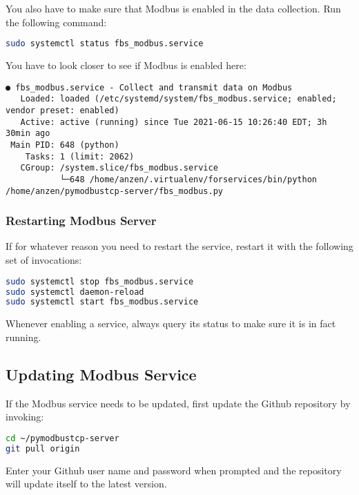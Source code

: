 \documentclass[10pt,]{article}
\begin{document}
You also have to make sure that Modbus is enabled in the data
collection. Run the following command:

\begin{lstlisting}[language=bash]
sudo systemctl status fbs_modbus.service
\end{lstlisting}

You have to look closer to see if Modbus is enabled here:

\begin{lstlisting}
● fbs_modbus.service - Collect and transmit data on Modbus
   Loaded: loaded (/etc/systemd/system/fbs_modbus.service; enabled; vendor preset: enabled)
   Active: active (running) since Tue 2021-06-15 10:26:40 EDT; 3h 30min ago
 Main PID: 648 (python)
    Tasks: 1 (limit: 2062)
   CGroup: /system.slice/fbs_modbus.service
           └─648 /home/anzen/.virtualenv/forservices/bin/python /home/anzen/pymodbustcp-server/fbs_modbus.py
\end{lstlisting}

\hypertarget{restarting-modbus-server}{%
\subsubsection{Restarting Modbus
Server}\label{restarting-modbus-server}}

If for whatever reason you need to restart the service, restart it with
the following set of invocations:

\begin{lstlisting}[language=bash]
sudo systemctl stop fbs_modbus.service
sudo systemctl daemon-reload
sudo systemctl start fbs_modbus.service
\end{lstlisting}

Whenever enabling a service, always query its status to make sure it is
in fact running.

\hypertarget{updating-modbus-service}{%
\subsection{Updating Modbus Service}\label{updating-modbus-service}}

If the Modbus service needs to be updated, first update the Github
repository by invoking:

\begin{lstlisting}[language=bash]
cd ~/pymodbustcp-server
git pull origin
\end{lstlisting}

Enter your Github user name and password when prompted and the
repository will update itself to the latest version.
\end{document}
